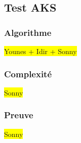 \subsection{Test AKS}
		

	\subsubsection{Algorithme}
		\colorbox{yellow}{Younes + Idir + Sonny}
		
	\subsubsection{Complexité}
		\colorbox{yellow}{Sonny}
	
	\subsubsection{Preuve}
		\colorbox{yellow}{Sonny}